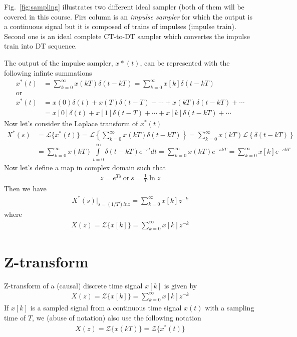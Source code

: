 \documentclass[twoside]{article}
\begin{document}
Fig.~\ref{fig:sampling} illustrates two different ideal sampler (both
of them will be covered in this course. Firs column is an
\textit{impulse sampler} for which the output is a continuous signal
but it is composed of trains of impulses (impulse train). Second one
is an ideal complete CT-to-DT sampler which convertes the impulse train
into DT sequence.

The output of the impulse sampler, $x*(t)$, can be represented with
the following infinte summations
%
\begin{align*}
  x^*(t) &= \sum\limits_{k=0}^{\infty} x(kT) \delta(t - kT) =
          \sum\limits_{k=0}^{\infty} x[k] \delta(t - kT) 
\\ \mathrm{or}& \\
  x^*(t) &= x(0) \delta(t) + x(T) \delta(t - T) + \cdots +
 x(k T) \delta(t - kT) + \cdots \\
&= x[0] \delta(t) + x[1] \delta(t - T) + \cdots +
 x[k] \delta(t - kT) + \cdots 
\end{align*}
Now let's consider the Laplace transform of $x^*(t)$
%
\begin{align*}
  X^*(s) &= \mathcal{L} \lbrace x^*(t) \rbrace = \mathcal{L}
  \left\lbrace \sum\limits_{k=0}^{\infty} x(kT) \delta(t - kT)
  \right\rbrace
= \sum\limits_{k=0}^{\infty} x(kT) \mathcal{L}
  \left\lbrace \delta(t - kT)
  \right\rbrace 
\\
  &= \sum\limits_{k=0}^{\infty} x(kT) 
  \int\limits_{t=0}^{\infty} \delta(t - kT) e^{-s t} dt
    = \sum\limits_{k=0}^{\infty} x(kT) e^{-s kT}
 = \sum\limits_{k=0}^{\infty} x[k] e^{-s kT}
\end{align*}
%
Now let's define a map in complex domain
such that 
%
\begin{align*}
z = e^{Ts} \ \mathrm{or} \ s = \frac{1}{T} \ln z
\end{align*}
%
Then we have
%
\begin{align*}
  X^*(s)|_{s = (1/T) ln z} = \sum\limits_{k=0}^{\infty} x[k] z^{-k} 
\end{align*}
%
where 
%
\begin{align*}
  X(z) = \mathcal{Z} \lbrace x[k] \rbrace = \sum\limits_{k=0}^{\infty} x[k] z^{-k} 
\end{align*}

\section*{Z-transform}
%
Z-transform of a (causal) discrete time signal $x[k]$ is given by 
%
\begin{align*}
  X(z) = \mathcal{Z} \lbrace x[k] \rbrace = \sum\limits_{k=0}^{\infty} x[k] z^{-k} 
\end{align*}
%
If $x[k]$ is a sampled signal from a continuous time signal $x(t)$
with a sampling time of $T$, we (abuse of notation) also use the
following notation
%
\begin{align*}
  X(z) = \mathcal{Z} \lbrace x(kT) \rbrace = \mathcal{Z} \lbrace x^*(t) \rbrace 
\end{align*}
% 
\end{document}
